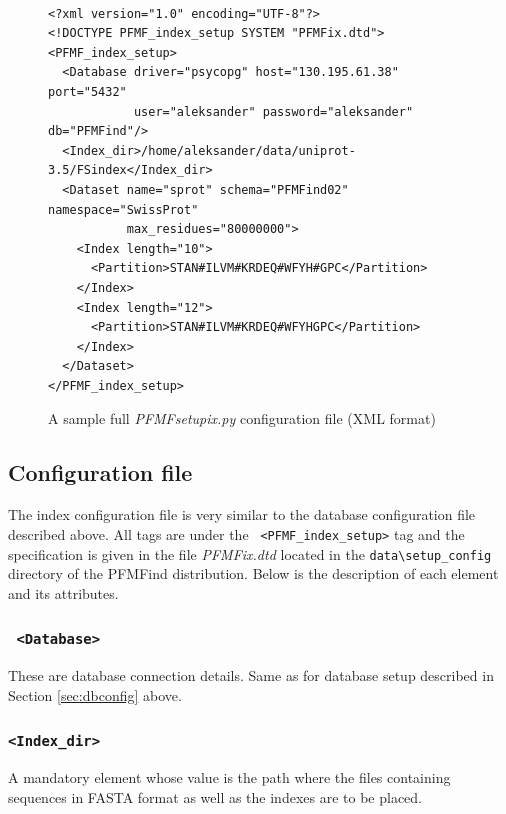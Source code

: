 \documentclass[10pt,letter]{article}
\begin{document}
\begin{figure}[h!]
\begin{mdframed}
{\small
\begin{verbatim}

<?xml version="1.0" encoding="UTF-8"?>
<!DOCTYPE PFMF_index_setup SYSTEM "PFMFix.dtd">
<PFMF_index_setup>
  <Database driver="psycopg" host="130.195.61.38" port="5432"
            user="aleksander" password="aleksander" db="PFMFind"/>
  <Index_dir>/home/aleksander/data/uniprot-3.5/FSindex</Index_dir>
  <Dataset name="sprot" schema="PFMFind02" namespace="SwissProt" 
           max_residues="80000000">
    <Index length="10">
      <Partition>STAN#ILVM#KRDEQ#WFYH#GPC</Partition>
    </Index>
    <Index length="12">
      <Partition>STAN#ILVM#KRDEQ#WFYHGPC</Partition>
    </Index>
  </Dataset>
</PFMF_index_setup>
\end{verbatim}
\caption{A sample full {\it PFMFsetupix.py} configuration file (XML format)}\label{fig:ixconfig}
}
\end{mdframed}
\end{figure}

\subsection{Configuration file}\label{sec:ixconfig}

The index configuration file is very similar to the database configuration file described above. All tags are under the \texttt{ <PFMF\_index\_setup>} tag and the specification is given in the file {\it PFMFix.dtd} located in the \verb|data\setup_config| directory of the PFMFind distribution. Below is the description of each element and its attributes.

\subsubsection*{\texttt{ <Database>}}

These are database connection details. Same as for database setup described in Section \ref{sec:dbconfig} above.

\subsubsection*{\texttt{<Index\_dir>}}

A mandatory element whose value is the path where the files containing sequences in FASTA format as well as the indexes are to be placed.
\end{document}
